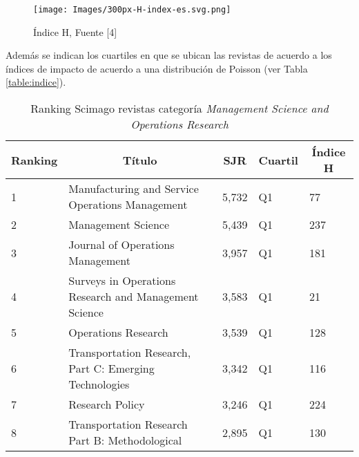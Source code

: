 \documentclass{article}
\begin{document}
\begin{figure}[H]
\texttt{[image: Images/300px-H-index-es.svg.png]}
\centering
\caption{Índice H, Fuente [4]}
\label{mas}
\end{figure}

Además se indican los cuartiles en que se ubican las revistas de acuerdo a los índices de impacto de acuerdo a una distribución de Poisson (ver Tabla \ref{table:indice}).

\begin{table}[H]
\caption{Ranking Scimago revistas categoría \textsl{Management Science and Operations Research} }
\begin{tabular}{@{}lllll@{}}
\hline\hline %
\toprule
\multicolumn{1}{c}{Ranking} & \multicolumn{1}{c}{Título} & \multicolumn{1}{c}{SJR} & \multicolumn{1}{c}{Cuartil} & \multicolumn{1}{c}{Índice H} \\ \midrule
\multicolumn{1}{|l|}{1} & \multicolumn{1}{l|}{Manufacturing and Service Operations Management} & \multicolumn{1}{l|}{5,732} & \multicolumn{1}{l|}{Q1} & \multicolumn{1}{l|}{77} \\ \midrule
\multicolumn{1}{|l|}{2} & \multicolumn{1}{l|}{Management Science} & \multicolumn{1}{l|}{5,439} & \multicolumn{1}{l|}{Q1} & \multicolumn{1}{l|}{237} \\ \midrule
\multicolumn{1}{|l|}{3} & \multicolumn{1}{l|}{Journal of Operations Management} & \multicolumn{1}{l|}{3,957} & \multicolumn{1}{l|}{Q1} & \multicolumn{1}{l|}{181} \\ \midrule
\multicolumn{1}{|l|}{4} & \multicolumn{1}{l|}{Surveys in Operations Research and Management Science} & \multicolumn{1}{l|}{3,583} & \multicolumn{1}{l|}{Q1} & \multicolumn{1}{l|}{21} \\ \midrule
\multicolumn{1}{|l|}{5} & \multicolumn{1}{l|}{Operations Research} & \multicolumn{1}{l|}{3,539} & \multicolumn{1}{l|}{Q1} & \multicolumn{1}{l|}{128} \\ \midrule
\multicolumn{1}{|l|}{6} & \multicolumn{1}{l|}{Transportation Research, Part C: Emerging Technologies} & \multicolumn{1}{l|}{3,342} & \multicolumn{1}{l|}{Q1} & \multicolumn{1}{l|}{116} \\ \midrule
\multicolumn{1}{|l|}{7} & \multicolumn{1}{l|}{Research Policy} & \multicolumn{1}{l|}{3,246} & \multicolumn{1}{l|}{Q1} & \multicolumn{1}{l|}{224} \\ \midrule
\multicolumn{1}{|l|}{8} & \multicolumn{1}{l|}{Transportation Research Part B: Methodological} & \multicolumn{1}{l|}{2,895} & \multicolumn{1}{l|}{Q1} & \multicolumn{1}{l|}{130} \\ \midrule

\end{tabular}
\end{table}
\end{document}
